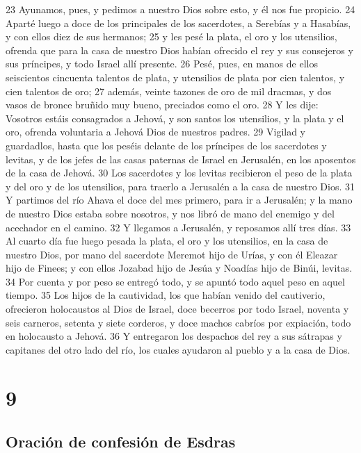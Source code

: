 23 Ayunamos, pues, y pedimos a nuestro Dios sobre esto, y él nos fue propicio.
24 Aparté luego a doce de los principales de los sacerdotes, a Serebías y a Hasabías, y con ellos diez de sus hermanos;
25 y les pesé la plata, el oro y los utensilios, ofrenda que para la casa de nuestro Dios habían ofrecido el rey y sus consejeros y sus príncipes, y todo Israel allí presente. 
26 Pesé, pues, en manos de ellos seiscientos cincuenta talentos de plata,  y utensilios de plata por cien talentos, y cien talentos de oro;
27 además, veinte tazones de oro de mil dracmas, y dos vasos de bronce bruñido muy bueno, preciados como el oro.
28 Y les dije: Vosotros estáis consagrados a Jehová, y son santos los utensilios, y la plata y el oro, ofrenda voluntaria a Jehová Dios de nuestros padres.
29 Vigilad y guardadlos, hasta que los peséis delante de los príncipes de los sacerdotes y levitas, y de los jefes de las casas paternas de Israel en Jerusalén, en los aposentos de la casa de Jehová.
30 Los sacerdotes y los levitas recibieron el peso de la plata y del oro y de los utensilios, para traerlo a Jerusalén a la casa de nuestro Dios.
31 Y partimos del río Ahava el doce del mes primero, para ir a Jerusalén; y la mano de nuestro Dios estaba sobre nosotros, y nos libró de mano del enemigo y del acechador en el camino.
32 Y llegamos a Jerusalén, y reposamos allí tres días.
33 Al cuarto día fue luego pesada la plata, el oro y los utensilios, en la casa de nuestro Dios, por mano del sacerdote Meremot hijo de Urías, y con él Eleazar hijo de Finees; y con ellos Jozabad hijo de Jesúa y Noadías hijo de Binúi, levitas.
34 Por cuenta y por peso se entregó todo, y se apuntó todo aquel peso en aquel tiempo.
35 Los hijos de la cautividad, los que habían venido del cautiverio, ofrecieron holocaustos al Dios de Israel, doce becerros por todo Israel, noventa y seis carneros, setenta y siete corderos, y doce machos cabríos por expiación, todo en holocausto a Jehová.
36 Y entregaron los despachos del rey a sus sátrapas y capitanes del otro lado del río, los cuales ayudaron al pueblo y a la casa de Dios.

\chapter{9}

\section*{Oración de confesión de Esdras}


